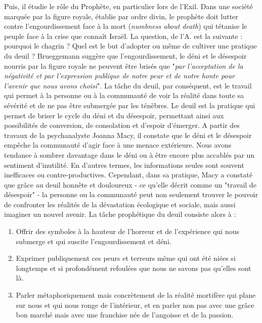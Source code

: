 Puis, il étudie le rôle du Prophète, en particulier lors de l'Exil. Dans une société marquée par la figure  royale, établie par ordre divin, le prophète doit lutter contre l'engourdissement face à la mort (\textit{numbness about death}) qui tétanise le peuple face à la crise que connaît Israël. La question, de l'A. est la suivante : pourquoi le chagrin ? Quel est le but d'adopter ou même de cultiver une pratique du deuil ? Brueggemann suggère que l'engourdissement, le déni et le désespoir nourris par la figure royale ne peuvent être brisés que "\textit{par l'acceptation de la négativité et par l'expression publique de notre peur et de notre honte pour l'avenir que nous avons choisi}". La tâche du deuil, par conséquent, est le travail qui permet à la personne ou à la communauté de voir la réalité dans toute sa sévérité et de ne pas être submergée par les ténèbres. Le deuil est la pratique qui permet de briser le cycle du déni et du désespoir, permettant ainsi aux possibilités de conversion, de consolation et d'espoir d'émerger. A partir des travaux de la psychanalyste Joanna Macy, il constate que le déni et le désespoir  empêche la communauté d'agir face à une menace extérieure. Nous avons tendance à sombrer davantage dans le déni ou à être encore plus accablés par un sentiment d'inutilité. En d'autres termes, les informations seules sont souvent inefficaces ou contre-productives. Cependant, dans sa pratique, Macy a constaté que grâce au deuil honnête et douloureux - ce qu'elle décrit comme un "travail de désespoir" - la personne ou la communauté peut non seulement trouver le pouvoir de confronter les réalités de la dévastation écologique et sociale, mais aussi imaginer un nouvel avenir.
La tâche prophétique du deuil consiste alors \cite[p. 159, cité par l'A. ]{brueggemann_prophetic_1978} à : \begin{enumerate}
    \item  Offrir des symboles à la hauteur de l'horreur et de l'expérience qui nous submerge et  qui suscite l'engourdissement et  déni.
    \item Exprimer publiquement ces peurs et terreurs même qui ont été niées si longtemps et si profondément refoulées que nous ne savons pas qu'elles sont là.
    \item Parler métaphoriquement mais concrètement de la réalité mortifère qui plane sur nous et qui nous ronge de l'intérieur, et en parler non pas avec une grâce bon marché mais avec une franchise née de l'angoisse et de la passion.
\end{enumerate}

